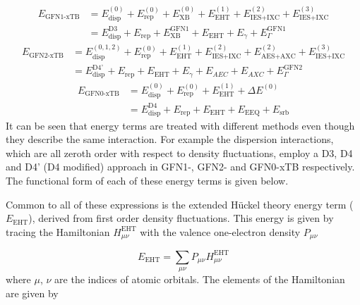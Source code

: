 \newcommand{\orderE}[2]{E^{\left(#1\right)}_{#2}}
\newcommand{\nameE}[2]{E^{#1}_{#2}}
\begin{equation}
\begin{aligned}
E_{\text{GFN1-xTB}} &= \orderE{0}{\text{disp}} + \orderE{0}{\text{rep}} + \orderE{0}{\text{XB}} + \orderE{1}{\text{EHT}} + \orderE{2}{\text{IES+IXC}} + \orderE{3}{\text{IES+IXC}} \\
&= \nameE{\text{D3}}{\text{disp}} + \nameE{}{\text{rep}} + \nameE{\text{GFN1}}{\text{XB}} + \nameE{}{\text{EHT}} + \nameE{}{\gamma} + \nameE{\text{GFN1}}{\Gamma}
\end{aligned}
\end{equation}
%
\begin{equation}
\begin{aligned}
E_{\text{GFN2-xTB}} &= \orderE{0,1,2}{\text{disp}} + \orderE{0}{\text{rep}} + \orderE{1}{\text{EHT}}  + \orderE{2}{\text{IES+IXC}} + \orderE{2}{\text{AES+AXC}} + \orderE{3}{\text{IES+IXC}} \\
&= \nameE{\text{D4'}}{\text{disp}} + \nameE{}{\text{rep}} + \nameE{}{\text{EHT}}  + \nameE{}{\gamma} + \nameE{}{AEC} + \nameE{}{AXC} + \nameE{\text{GFN2}}{\Gamma}
\end{aligned}
\end{equation}
%
\begin{equation}
\begin{aligned}
E_{\text{GFN0-xTB}} &= \orderE{0}{\text{disp}} + \orderE{0}{\text{rep}} + \orderE{1}{\text{EHT}}  + \Delta\orderE{0}{} \\
&= \nameE{\text{D4}}{\text{disp}} + \nameE{}{\text{rep}} + \nameE{}{\text{EHT}}  + \nameE{}{\text{EEQ}} + \nameE{}{\text{srb}}
\end{aligned}
\end{equation}
%
It can be seen that energy terms are treated with different methods even though 
they describe the same interaction. For example the dispersion interactions, which
are all zeroth order with respect to density fluctuations, employ a D3, D4 and D4'
(D4 modified) approach in GFN1-, GFN2- and GFN0-xTB respectively. The functional
form of each of these energy terms is given below.

Common to all of these expressions is the extended H\"{u}ckel theory energy term ($\nameE{}{\text{EHT}}$),
derived from first order density fluctuations. This energy is given by tracing the
Hamiltonian $H_{\mu\nu}^{\text{EHT}}$ with the valence one-electron density $P_{\mu\nu}$

\begin{equation}
E_{\text{EHT}} = \sum_{\mu\nu} P_{\mu\nu} H_{\mu\nu}^{\text{EHT}}
\end{equation}
%
where $\mu$, $\nu$ are the indices of atomic orbitals. The elements of the Hamiltonian 
are given by 

